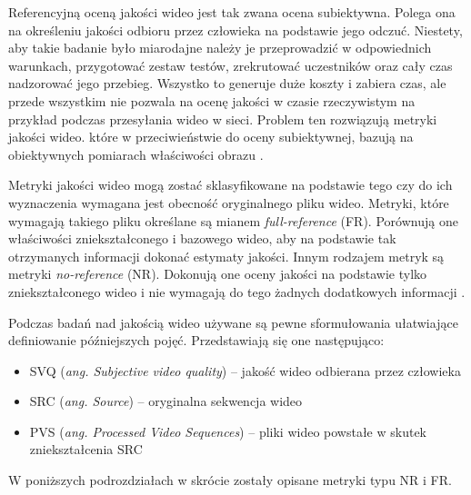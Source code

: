 Referencyjną oceną jakości wideo jest tak zwana ocena subiektywna. Polega ona na określeniu jakości odbioru przez człowieka na podstawie jego odczuć. Niestety, aby takie badanie było miarodajne należy je przeprowadzić w odpowiednich warunkach, przygotować zestaw testów, zrekrutować uczestników oraz cały czas nadzorować jego przebieg. Wszystko to generuje duże koszty i zabiera czas, ale przede wszystkim nie pozwala na ocenę jakości w czasie rzeczywistym na przykład podczas przesyłania wideo w sieci. Problem ten rozwiązują metryki jakości wideo. które w przeciwieństwie do oceny subiektywnej, bazują na obiektywnych pomiarach właściwości obrazu \cite{vqm}.\par

Metryki jakości wideo mogą zostać sklasyfikowane na podstawie tego czy do ich wyznaczenia wymagana jest obecność oryginalnego pliku wideo. Metryki, które wymagają takiego pliku określane są mianem {\em  full-reference} (FR). Porównują one właściwości zniekształconego i bazowego wideo, aby na podstawie tak otrzymanych informacji dokonać estymaty jakości. Innym rodzajem metryk są metryki {\em no-reference} (NR). Dokonują one oceny jakości na podstawie tylko zniekształconego wideo i nie wymagają do tego żadnych dodatkowych informacji \cite{vqm}.\par



Podczas badań nad jakością  wideo używane są pewne sformułowania ułatwiające definiowanie późniejszych pojęć. Przedstawiają się one następująco:
\begin{itemize}[label=$\bullet$]
	\item SVQ (\emph{ang. Subjective video quality}) -- jakość wideo odbierana przez człowieka
	\item SRC (\emph{ang. Source}) -- oryginalna sekwencja wideo
	\item PVS (\emph{ang. Processed Video Sequences}) -- pliki wideo powstałe w skutek zniekształcenia SRC
\end{itemize}

W poniższych podrozdziałach w skrócie zostały opisane metryki typu NR i FR.

